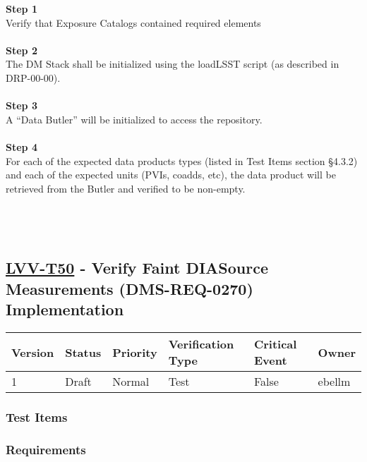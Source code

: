 \textbf{Step 1}\\
Verify that Exposure Catalogs contained required elements\\
~\\
\textbf{Step 2}\\
The DM Stack shall be initialized using the loadLSST script (as
described in DRP-00-00).\\
~\\
\textbf{Step 3}\\
A ``Data Butler'' will be initialized to access the repository.\\
~\\
\textbf{Step 4}\\
For each of the expected data products types (listed in Test Items
section §4.3.2) and each of the expected units (PVIs, coadds, etc), the
data product will be retrieved from the Butler and verified to be
non-empty.\\
~\\
~\\
~\\

\hypertarget{lvv-t50---verify-faint-diasource-measurements-dms-req-0270-implementation}{%
\subsection{\texorpdfstring{\href{https://jira.lsstcorp.org/secure/Tests.jspa\#/testCase/LVV-T50}{LVV-T50}
- Verify Faint DIASource Measurements (DMS-REQ-0270)
Implementation}{LVV-T50 - Verify Faint DIASource Measurements (DMS-REQ-0270) Implementation}}\label{lvv-t50---verify-faint-diasource-measurements-dms-req-0270-implementation}}

\begin{longtable}[]{@{}llllll@{}}
\toprule
Version & Status & Priority & Verification Type & Critical Event &
Owner\tabularnewline
\midrule
\endhead
1 & Draft & Normal & Test & False & ebellm\tabularnewline
\bottomrule
\end{longtable}

\hypertarget{test-items-19}{%
\subsubsection{Test Items}\label{test-items-19}}

\hypertarget{requirements-38}{%
\subsubsection{Requirements}\label{requirements-38}}

